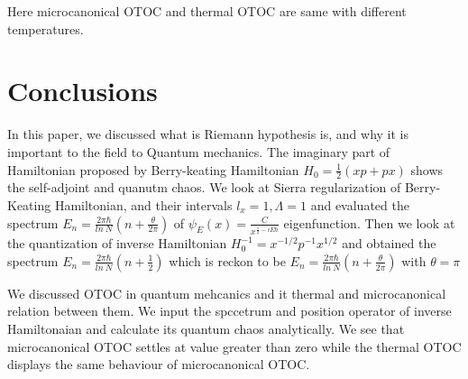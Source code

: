 \documentclass[12pt, letterpaper]{article}
\newcommand*{\1}{\hspace{1pt}}
\begin{document}
        Here microcanonical OTOC and thermal OTOC are same with different temperatures.

        
        
        \section{Conclusions}

        In this paper, we discussed what is Riemann hypothesis is, and why it is important to the field to Quantum mechanics. The imaginary part of Hamiltonian proposed by 
        Berry-keating Hamiltonian $H_{0} = \frac{1}{2}(xp+px)$ shows the self-adjoint and quanutm chaos. We look at Sierra regularization of Berry-Keating Hamiltonian, and 
        their intervals $l_{x}=1, \Lambda=1$ and evaluated the spectrum $E_{n} = \frac{2\pi \hbar}{ln \ N}(n+\frac{\theta}{2\pi})$ of $\psi_{E}(x) = \frac{C}{x^{\frac{1}{2}-iE\hbar}}$
        eigenfunction. Then we look at the quantization of inverse Hamiltonian $H_{0}^{-1} = x^{-1/2}p^{-1}x^{1/2} $ and obtained the spectrum $E_{n} = \frac{2\pi \hbar}{ln \ N}(n+\frac{1}{2})$
        which is reckon to be $E_{n} = \frac{2\pi \hbar}{ln \ N}(n+\frac{\theta}{2\pi})$ with $\theta = \pi$

        We discussed OTOC in quantum mehcanics and it thermal and microcanonical relation between them. We input the spccetrum and position operator of inverse Hamiltonaian 
        and calculate its quantum chaos analytically. We see that microcanonical OTOC settles at value greater than zero while the thermal OTOC displays the same behaviour
        of microcanonical OTOC.
    
    
\end{document}
